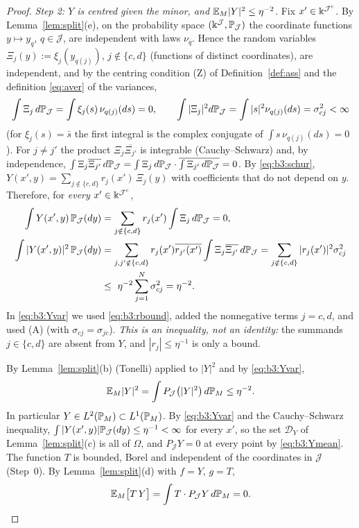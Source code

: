 \begin{proof}
\smallskip\noindent\emph{Step 2: $Y$ is centred given the minor, and $\E_M|Y|^2\le\eta^{-2}$.} Fix $x'\in\K^{\mathcal J^c}$. By Lemma~\ref{lem:split}(e), on the probability space $(\K^{\mathcal J},\P_{\mathcal J})$
the coordinate functions $y\mapsto y_q$, $q\in\mathcal J$, are independent with laws $\nu_q$. Hence the random variables $\Xi_j(y):=\xi_j(y_{q(j)})$, $j\notin\{c,d\}$ (functions of distinct coordinates),
are independent, and by the centring condition (Z) of Definition~\ref{def:ass} and the definition \eqref{eq:aver} of the variances,
\[
\int\Xi_j\,d\P_{\mathcal J}=\int\xi_j(s)\,\nu_{q(j)}(ds)=0,\qquad\int|\Xi_j|^2d\P_{\mathcal J}=\int|s|^2\nu_{q(j)}(ds)=\sigma_{cj}^2<\infty
\]
(for $\xi_j(s)=\bar s$ the first integral is the complex conjugate of $\int s\,\nu_{q(j)}(ds)=0$). For $j\ne j'$ the product $\Xi_j\overline{\Xi_{j'}}$ is integrable (Cauchy--Schwarz) and, by independence,
$\int\Xi_j\overline{\Xi_{j'}}\,d\P_{\mathcal J}=\int\Xi_j\,d\P_{\mathcal J}\cdot\overline{\int\Xi_{j'}\,d\P_{\mathcal J}}=0$. By \eqref{eq:b3:schur}, $Y(x',y)=\sum_{j\notin\{c,d\}}r_j(x')\,\Xi_j(y)$ with coefficients that do not depend on $y$. Therefore,
for \emph{every} $x'\in\K^{\mathcal J^c}$,
\begin{align}
\int Y(x',y)\,\P_{\mathcal J}(dy)&=\sum_{j\notin\{c,d\}}r_j(x')\int\Xi_j\,d\P_{\mathcal J}=0,\label{eq:b3:Ymean}\\
\int|Y(x',y)|^2\,\P_{\mathcal J}(dy)&=\sum_{j,j'\notin\{c,d\}}r_j(x')\overline{r_{j'}(x')}\int\Xi_j\overline{\Xi_{j'}}\,d\P_{\mathcal J}=\sum_{j\notin\{c,d\}}|r_j(x')|^2\sigma_{cj}^2\notag\\
&\le\ \eta^{-2}\sum_{j=1}^N\sigma_{cj}^2=\eta^{-2}.\label{eq:b3:Yvar}
\end{align}
In \eqref{eq:b3:Yvar} we used \eqref{eq:b3:rbound}, added the nonnegative terms $j=c,d$, and used (A) (with $\sigma_{cj}=\sigma_{jc}$). \emph{This is an inequality, not an identity:} the summands $j\in\{c,d\}$ are absent from $Y$,
and $|r_j|\le\eta^{-1}$ is only a bound.

By Lemma~\ref{lem:split}(b) (Tonelli) applied to $|Y|^2$ and by \eqref{eq:b3:Yvar},
\begin{equation}\label{eq:b3:Y2}
\E_M|Y|^2=\int P_{\mathcal J}\big(|Y|^2\big)\,d\P_M\le\eta^{-2}.
\end{equation}
In particular $Y\in L^2(\P_M)\subset L^1(\P_M)$. By \eqref{eq:b3:Yvar} and the Cauchy--Schwarz inequality, $\int|Y(x',y)|\P_{\mathcal J}(dy)\le\eta^{-1}<\infty$ for every $x'$, so the set $\mathcal D_Y$ of Lemma~\ref{lem:split}(c) is all of $\Omega$,
and $P_{\mathcal J}Y=0$ at every point by \eqref{eq:b3:Ymean}. The function $T$ is bounded, Borel and independent of the coordinates in $\mathcal J$ (Step~0). By Lemma~\ref{lem:split}(d) with $f=Y$, $g=T$,
\begin{equation}\label{eq:b3:TY}
\E_M\big[T\,Y\big]=\int T\cdot P_{\mathcal J}Y\,d\P_M=0 .
\end{equation}


\end{proof}
